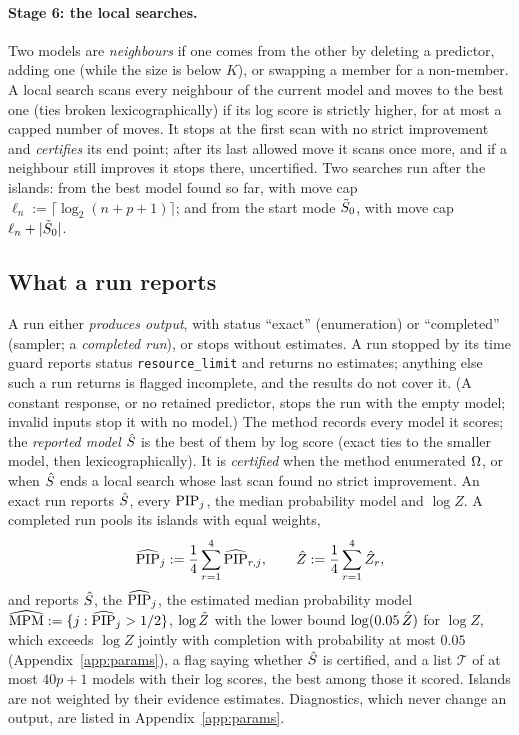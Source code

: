 \paragraph{Stage 6: the local searches.} Two models are \emph{neighbours} if one comes from the other by deleting a
predictor, adding one (while the size is below $K$), or swapping a member for a non-member. A local search scans every
neighbour of the current model and moves to the best one (ties broken lexicographically) if its log score is strictly
higher, for at most a capped number of moves. It stops at the first scan with no strict improvement and \emph{certifies}
its end point; after its last allowed move it scans once more, and if a neighbour still improves it stops there,
uncertified. Two searches run after the islands: from the best model found so far, with move cap
$\ell_n:=\lceil\log_2(n+p+1)\rceil$; and from the start mode $\tilde S_0$, with move cap $\ell_n+\lvert \tilde S_0\rvert$.

\subsection{What a run reports}\label{sec:outputs-method}

A run either \emph{produces output}, with status ``exact'' (enumeration) or ``completed'' (sampler; a \emph{completed
run}), or stops without estimates. A run stopped by its time guard reports status \texttt{resource\_limit} and returns no
estimates; anything else such a run returns is flagged incomplete, and the results do not cover it. (A constant
response, or no retained predictor, stops the run with the empty model; invalid inputs stop it with no model.) The method records every model
it scores; the \emph{reported model} $\hat S$ is the best of them by log score (exact ties to the smaller model, then
lexicographically). It is \emph{certified} when the method enumerated $\Omega$, or when $\hat S$ ends a local search whose last
scan found no strict improvement. An exact run reports $\hat S$, every $\mathrm{PIP}_j$, the median probability model and $\log Z$.
A completed run pools its islands with equal weights,
\begin{equation}\label{eq:pool}
  \widehat{\mathrm{PIP}}_j:=\frac14\sum_{r=1}^4\widehat{\mathrm{PIP}}_{r,j},\qquad \hat Z:=\frac14\sum_{r=1}^4\hat Z_r,
\end{equation}
and reports $\hat S$, the $\widehat{\mathrm{PIP}}_j$, the estimated median probability model $\widehat{\mathrm{MPM}}:=\{j:\widehat{\mathrm{PIP}}_j>1/2\}$, $\log\hat Z$
with the lower bound $\log(0.05\,\hat Z)$ for $\log Z$, which exceeds $\log Z$ jointly with completion with probability at
most $0.05$ (Appendix~\ref{app:params}), a flag saying whether
$\hat S$ is certified, and a list $\mathcal T$ of at most $40p+1$ models with their log scores, the best among those it scored. Islands are not
weighted by their evidence estimates. Diagnostics, which never change an output, are listed in
Appendix~\ref{app:params}.

